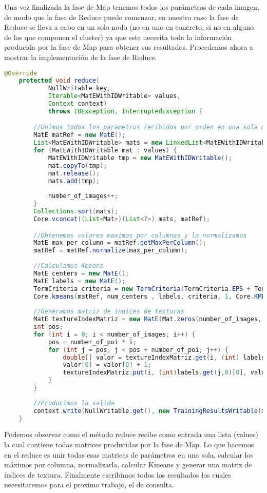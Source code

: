 Una vez finalizada la fase de Map tenemos todos los parámetros de cada imagen, de modo que la fase de Reduce puede comenzar, en nuestro caso la fase de Reduce se lleva a cabo en un solo nodo (no en uno en concreto, si no en alguno de los que componen el cluster) ya que este necesita toda la información producida por la fase de Map para obtener sus resultados. Procedemos ahora a mostrar la implementación de la fase de Reduce.

 \begin{lstlisting}[language=Java]
@Override
	protected void reduce(
			NullWritable key,
			Iterable<MatEWithIDWritable> values,
			Context context)
			throws IOException, InterruptedException {

		//Unimos todos los parametros recibidos por orden en una sola matriz
		MatE matRef = new MatE();
		List<MatEWithIDWritable> mats = new LinkedList<MatEWithIDWritable>();
		for (MatEWithIDWritable mat : values) {
			MatEWithIDWritable tmp = new MatEWithIDWritable();
			mat.copyTo(tmp);
			mat.release();
			mats.add(tmp);
			
			number_of_images++;
		}
		Collections.sort(mats);
		Core.vconcat((List<Mat>)(List<?>) mats, matRef);

		//Obtenemos valores maximos por columnas y la normalizamos
		MatE max_per_column = matRef.getMaxPerColumn();
		matRef = matRef.normalize(max_per_column);
		
		//Calculamos Kmeans
		MatE centers = new MatE();
		MatE labels = new MatE();
		TermCriteria criteria = new TermCriteria(TermCriteria.EPS + TermCriteria.MAX_ITER, 10000, 0.0001);
		Core.kmeans(matRef, num_centers , labels, criteria, 1, Core.KMEANS_RANDOM_CENTERS, centers);
		
		//Generamos matriz de indices de texturas
		MatE textureIndexMatriz = new MatE(Mat.zeros(number_of_images, num_centers, CvType.CV_32F));
		int pos;
		for (int i = 0; i < number_of_images; i++) {
			pos = number_of_poi * i;
			for (int j = pos; j < pos + number_of_poi; j++) {
				double[] valor = textureIndexMatriz.get(i, (int) labels.get(j, 0)[0]);
				valor[0] = valor[0] + 1;
				textureIndexMatriz.put(i, (int)labels.get(j,0)[0], valor);
			}
		}
		
		//Producimos la salida
		context.write(NullWritable.get(), new TrainingResultsWritable(max_per_column, centers, textureIndexMatriz));
	}
\end{lstlisting}

Podemos observar como el método reduce recibe como entrada una lista (values) la cual contiene todas matrices producidas por la fase de Map. Lo que hacemos en el reduce es unir todas esas matrices de parámetros en una sola, calcular los máximos por columna, normalizarla, calcular Kmeans y generar una matriz de \'indices de textura. Finalmente escribimos todos los resultados los cuales necesitaremos para el proximo trabajo, el de consulta.

